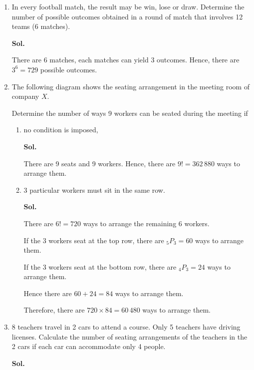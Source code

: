 \documentclass{report}
\newcommand\permtwo[2][^n]{{}_{#1}P_{#2}}
\newcommand{\sol}[1]{

      \noindent \textbf{Sol.}
}
\def\eos{\quad\hbox{\rlap{\hbox{\vrule depth 1.5pt height 2.6mm width 0.2mm \hskip 1mm \vrule height 2.6mm width 0.2mm}}{\vbox{\hrule height 0.2mm width 1.4mm \vskip 2.8mm \hrule depth 1.5pt height -0.35mm width 1.2mm}}}}
\begin{document}
\begin{multicols*}{2}
\begin{enumerate}
            \item In every football match, the result may be win, lose or draw. Determine the
                  number of possible outcomes obtained in a round of match that involves 12 teams
                  (6 matches). \sol{}

                  There are 6 matches, each matches can yield 3 outcomes. Hence, there are $3^6 =
                        729$ possible outcomes. $\eos$

            \item The following diagram shows the seating arrangement in the meeting room of
                  company $X$.

                  Determine the number of ways 9 workers can be seated during the meeting if
                  \begin{enumerate}
                        \item no condition is imposed, \sol{}

                              There are 9 seats and 9 workers. Hence, there are $9! = 362\,880$ ways to
                              arrange them. $\eos$

                        \item 3 particular workers must sit in the same row.
                              \sol{}

                              There are $6! = 720$ ways to arrange the remaining 6 workers.

                              If the 3 workers seat at the top row, there are $\permtwo[5]{3} = 60$ ways to
                              arrange them.

                              If the 3 workers seat at the bottom row, there are $\permtwo[4]{3} = 24$ ways
                              to arrange them.

                              Hence there are $60 + 24 = 84$ ways to arrange them.

                              Therefore, there are $720 \times 84 = 60\,480$ ways to arrange them. $\eos$
                  \end{enumerate}

            \item 8 teachers travel in 2 cars to attend a course. Only 5 teachers have driving licenses. Calculate the number of seating arrangements of the teachers in the 2 cars if each car can accommodate only 4 people.
                  \sol{}


\end{enumerate}
\end{multicols*}
\end{document}
